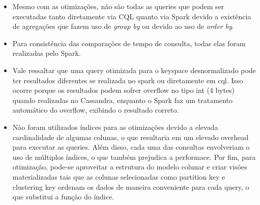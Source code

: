 \documentclass[12pt]{article}
\begin{document}
\begin{itemize}
    \item Mesmo com as otimizações, não são todas as queries que podem ser executadas tanto diretamente via CQL quanto via Spark devido a existência de agregações que fazem uso de \emph{group by} ou devido ao uso de \emph{order by}.
    \item Para consistência das comparações de tempo de consulta, todas elas foram realizadas pelo Spark.
    \item Vale ressaltar que uma query otimizada para o keyspace desnormalizado pode ter resultados diferentes se realizada no spark ou diretamente em cql. Isso ocorre porque os resultados podem sofrer overflow no tipo int (4 bytes) quando realizadas no Cassandra, enquanto o Spark faz um tratamento automático do overflow, exibindo o resultado correto.
    \item Não foram utilizados índices para as otimizações devido a elevada cardinalidade de algumas colunas, o que resultaria em um elevado overhead para executar as queries. Além disso, cada uma das consultas envolveriam o uso de múltiplos índices, o que também prejudica a performace. Por fim, para otimização, pode-se aproveitar a estrutura do modelo colunar e criar visões materializadas tais que as colunas selecionadas como partition key e clustering key ordenam os dados de maneira conveniente para cada query, o que substitui a função do índice.
\end{itemize}
\end{document}

